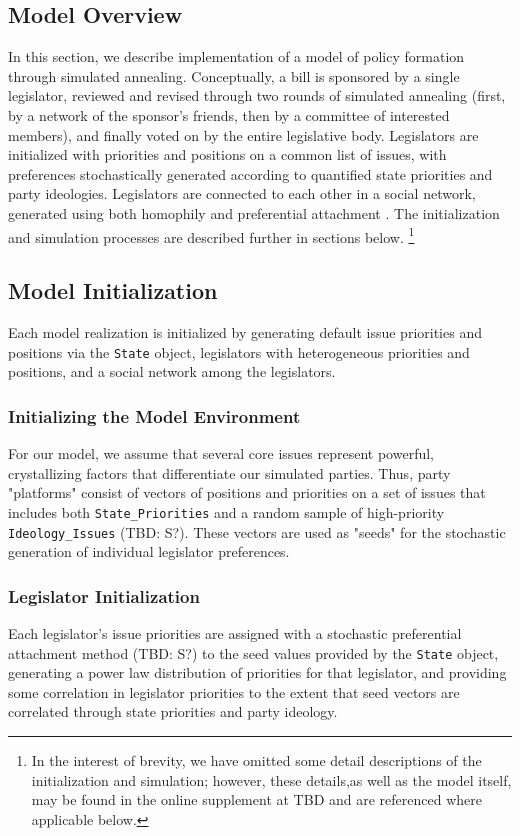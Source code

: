 \documentclass[pdftex,12pt,oribibl]{llncs}
\begin{document}
\subsection{Model Overview}
In this section, we describe implementation of a model of policy formation through simulated annealing.
Conceptually, a bill is sponsored by a single legislator, reviewed and revised through two rounds of simulated annealing (first, by a network of the sponsor's friends, then by a committee of interested members), and finally voted on by the entire legislative body.
Legislators are initialized with priorities and positions on a common list of issues, with preferences stochastically generated according to quantified state priorities and party ideologies.
Legislators are connected to each other in a social network, generated using both homophily \parencite{msc01, br11} and preferential attachment \parencite{Barabasi1999}.
The initialization and simulation processes are described further in sections below.
\footnote{In the interest of brevity, we have omitted some detail descriptions of the initialization and simulation; however, these details,as well as the model itself, may be found in the online supplement at TBD and are referenced where applicable below.}
\subsection{Model Initialization}
Each model realization is initialized by generating default issue priorities and positions via the \texttt{State} object, legislators with heterogeneous priorities and positions, and a social network among the legislators.
\subsubsection{Initializing the Model Environment}
For our model, we assume that several core issues represent powerful, crystallizing factors that differentiate our simulated parties.
Thus, party "platforms" consist of vectors of positions and priorities on a set of issues that includes both \texttt{State\_Priorities} and a random sample of high-priority \texttt{Ideology\_Issues} (TBD: S?).
These vectors are used as "seeds" for the stochastic generation of individual legislator preferences.
\subsubsection{Legislator Initialization}
Each legislator's issue priorities are assigned with a stochastic preferential attachment method (TBD: S?) to the seed values provided by the \texttt{State} object, generating a power law distribution of priorities for that legislator, and providing some correlation in legislator priorities to the extent that seed vectors are correlated through state priorities and party ideology.
\end{document}
